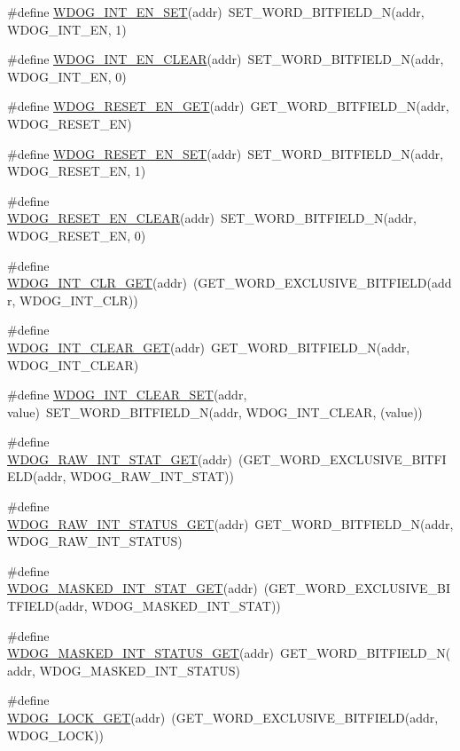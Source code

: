 \begin{DoxyCompactItemize}
\item 
\#define \hyperlink{a00576_af60b57cf896d0df67d960c8a0738110a}{WDOG\_\-INT\_\-EN\_\-SET}(addr)~SET\_\-WORD\_\-BITFIELD\_\-N(addr, WDOG\_\-INT\_\-EN, 1)
\item 
\#define \hyperlink{a00576_a223dc67c8a74230826b6381b81d16521}{WDOG\_\-INT\_\-EN\_\-CLEAR}(addr)~SET\_\-WORD\_\-BITFIELD\_\-N(addr, WDOG\_\-INT\_\-EN, 0)
\item 
\#define \hyperlink{a00576_a742f0d30b6b71738bb10b8cb78a0e691}{WDOG\_\-RESET\_\-EN\_\-GET}(addr)~GET\_\-WORD\_\-BITFIELD\_\-N(addr, WDOG\_\-RESET\_\-EN)
\item 
\#define \hyperlink{a00576_a3676cfcb7b8e0694fa5ba69479dc7c07}{WDOG\_\-RESET\_\-EN\_\-SET}(addr)~SET\_\-WORD\_\-BITFIELD\_\-N(addr, WDOG\_\-RESET\_\-EN, 1)
\item 
\#define \hyperlink{a00576_adf9e5a22f0186e71214bbba8ddbe4dfb}{WDOG\_\-RESET\_\-EN\_\-CLEAR}(addr)~SET\_\-WORD\_\-BITFIELD\_\-N(addr, WDOG\_\-RESET\_\-EN, 0)
\item 
\#define \hyperlink{a00576_ab9f9d827e06463837a9fac3c93b6937f}{WDOG\_\-INT\_\-CLR\_\-GET}(addr)~(GET\_\-WORD\_\-EXCLUSIVE\_\-BITFIELD(addr, WDOG\_\-INT\_\-CLR))
\item 
\#define \hyperlink{a00576_a4a42aa88584d207ac3078fa13363d0a7}{WDOG\_\-INT\_\-CLEAR\_\-GET}(addr)~GET\_\-WORD\_\-BITFIELD\_\-N(addr, WDOG\_\-INT\_\-CLEAR)
\item 
\#define \hyperlink{a00576_a2654f4935bcaaff4b0a01ea8c8553258}{WDOG\_\-INT\_\-CLEAR\_\-SET}(addr, value)~SET\_\-WORD\_\-BITFIELD\_\-N(addr, WDOG\_\-INT\_\-CLEAR, (value))
\item 
\#define \hyperlink{a00576_a678c7ac43c1771176300ea5980cc4624}{WDOG\_\-RAW\_\-INT\_\-STAT\_\-GET}(addr)~(GET\_\-WORD\_\-EXCLUSIVE\_\-BITFIELD(addr, WDOG\_\-RAW\_\-INT\_\-STAT))
\item 
\#define \hyperlink{a00576_ac1614e6c96a1c2864e93f3cbb6aeeceb}{WDOG\_\-RAW\_\-INT\_\-STATUS\_\-GET}(addr)~GET\_\-WORD\_\-BITFIELD\_\-N(addr, WDOG\_\-RAW\_\-INT\_\-STATUS)
\item 
\#define \hyperlink{a00576_aa0814dfdeb3fe59154b19d56f7f0dcd8}{WDOG\_\-MASKED\_\-INT\_\-STAT\_\-GET}(addr)~(GET\_\-WORD\_\-EXCLUSIVE\_\-BITFIELD(addr, WDOG\_\-MASKED\_\-INT\_\-STAT))
\item 
\#define \hyperlink{a00576_a3c4c54c54fcc5b53ff45289b218ff178}{WDOG\_\-MASKED\_\-INT\_\-STATUS\_\-GET}(addr)~GET\_\-WORD\_\-BITFIELD\_\-N(addr, WDOG\_\-MASKED\_\-INT\_\-STATUS)
\item 
\#define \hyperlink{a00576_abeaa01cf95da51f7c5efc52f667dd80e}{WDOG\_\-LOCK\_\-GET}(addr)~(GET\_\-WORD\_\-EXCLUSIVE\_\-BITFIELD(addr, WDOG\_\-LOCK))

\end{DoxyCompactItemize}
